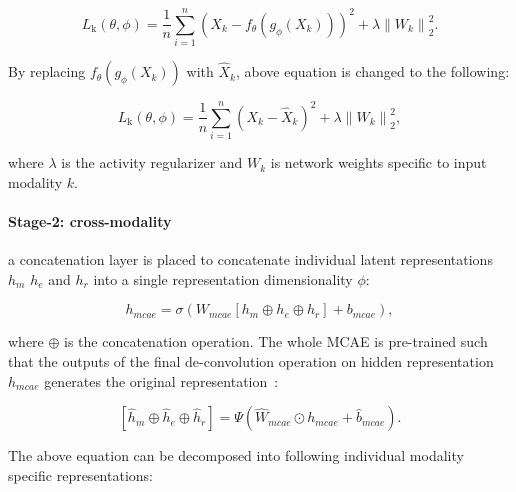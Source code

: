 \begin{equation}
    L_{\mathrm{k}}(\theta, \phi)=\frac{1}{n} \sum_{i=1}^{n}\left({X_k}-f_{\theta}\left(g_{\phi}\left({X_k}\right)\right)\right)^{2} +\lambda\left\|W_{k}\right\|_{2}^{2}.
\end{equation} 

\hspace*{3.5mm} By replacing $f_{\theta}\left(g_{\phi}\left({X_k}\right)\right)$ with $\hat{X}_{k}$, above equation is changed to the following: 

\begin{equation}
    L_{\mathrm{k}}(\theta, \phi)=\frac{1}{n} \sum_{i=1}^{n}\left({X_k}-\hat{X}_{k}\right)^{2} +\lambda\left\|W_{k}\right\|_{2}^{2},
\end{equation} 

\hspace*{3.5mm} where $\lambda$ is the activity regularizer and $W_{k}$ is network weights specific to input modality $k$. 

\paragraph{Stage-2: cross-modality}\hspace{-3mm} 
a concatenation layer is placed to concatenate individual latent representations $h_{m}$ $h_{e}$ and $h_{r}$ into a single representation dimensionality $\phi$:  

\begin{equation}
    h_{mcae}=\sigma\left(W_{mcae}\left[h_{m} \oplus h_{e} \oplus h_{r}\right]+b_{mcae}\right),
\end{equation}

\hspace*{3.5mm} where $\oplus$ is the concatenation operation. The whole MCAE is pre-trained such that the outputs of the final de-convolution operation on hidden representation $h_{mcae}$ generates the original representation~\cite{wang2018associativemulti}: 

\begin{equation}
    \left[\hat{h}_{m}\oplus \hat{h}_{e} \oplus \hat{h}_{r}
    \right]=\Psi\left(\hat W_{mcae} \odot h_{mcae}+\hat {b}_{mcae}\right).
\end{equation}

\hspace*{3.5mm} The above equation can be decomposed into following individual modality specific representations:  

